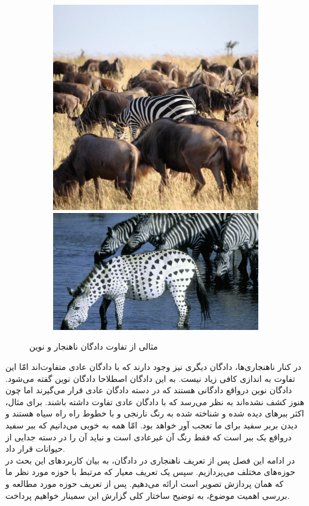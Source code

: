 \documentclass[12pt,a4paper]{report}
\theoremstyle{definition}
\theoremstyle{definition}
\begin{document}
	\begin{figure}[hp]
		  \begin{subfigure}{\linewidth}
			  \includegraphics[width=.5\linewidth]{./images/figures/zibra-anomaly.png}\hfill
			  \includegraphics[width=.5\linewidth]{./images/figures/zibra-novel.png}
		  \end{subfigure}\par\medskip		  
		  \caption{مثالی از تفاوت دادگان ناهنجار و نوین}
		  \label{fig:novel-vs-anomaly}
	\end{figure}

در کنار ناهنجاری‌ها، دادگان دیگری نیز وجود دارند که با دادگان عادی متفاوت‌اند امّا این تفاوت به اندازی کافی زیاد نیست. به این دادگان اصطلاحا دادگان نوین گفته می‌شود. دادگان نوین درواقع دادگانی هستند که در دسته دادگان عادی قرار می‌گیرند اما چون هنوز کشف نشده‌اند به نظر می‌رسد که با دادگان عادی تفاوت داشته باشند. برای مثال، اکثر ببر‌های دیده شده و شناخته شده به رنگ نارنجی و با خطوط راه راه سیاه هستند و دیدن بربر سفید برای ما تعجب آور خواهد بود. امّا همه به خوبی می‌دانیم که ببر سفید درواقع یک ببر است که فقط رنگ آن غیرعادی است و نباید آن را در دسته جدایی از حیوانات قرار داد.\\

در ادامه این فصل پس از تعریف ناهنجاری در دادگان، به بیان کاربرد‌های این بحث در حوزه‌های مختلف می‌پردازیم. سپس یک تعریف معیار که مرتبط با حوزه مورد نظر ما که همان پردازش تصویر است ارائه می‌دهیم. پس از تعریف حوزه مورد مطالعه و بررسی اهمیت موضوع، به توضیح ساختار کلی گزارش این سمینار خواهیم پرداخت.
		
\end{document}
